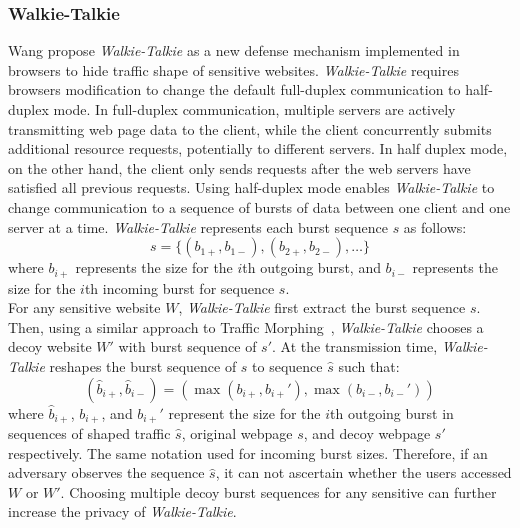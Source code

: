\subsubsection{Walkie-Talkie}\label{subsubsec:walkie-talkie}
Wang propose \textit{Walkie-Talkie} as a new defense mechanism implemented in browsers to hide traffic shape of sensitive websites.
\textit{Walkie-Talkie} requires browsers modification to change the default full-duplex communication to half-duplex mode.
In full-duplex communication, multiple servers are actively transmitting web page data to the client, while the client concurrently submits additional resource requests, potentially to different servers.
In half duplex mode, on the other hand, the client only sends requests after the web servers have satisfied all previous requests.
Using half-duplex mode enables \textit{Walkie-Talkie} to change communication to a sequence of bursts of data between one client and one server at a time. 
\textit{Walkie-Talkie} represents each burst sequence $s$ as follows:
\begin{equation*}
  s = \{(b_{1+}, b_{1-}), (b_{2+}, b_{2-}), \dots \}
\end{equation*}
where $b_{i+}$ represents the size for the $i$th outgoing burst, and $b_{i-}$ represents the size for the $i$th incoming burst for sequence $s$.
\\
For any sensitive website $W$, \textit{Walkie-Talkie} first extract the burst sequence $s$.  
Then, using a similar approach to Traffic Morphing~\cite{wright2009traffic}, \textit{Walkie-Talkie} chooses a decoy website $W'$ with burst sequence of $s'$.
At the transmission time, \textit{Walkie-Talkie} reshapes the burst sequence of $s$ to sequence $\hat{s}$ such that:
\begin{equation*}
  (\hat{b}_{i+}, \hat{b}_{i-}) = (\max(b_{i+}, b_{i+}'), \max(b_{i-}, b_{i-}'))
\end{equation*}
where $\hat{b}_{i+}$, $b_{i+}$, and $b_{i+}'$ represent the size for the $i$th outgoing burst in sequences of shaped traffic $\hat{s}$, original webpage $s$, and decoy webpage $s'$ respectively.
The same notation used for incoming burst sizes.
Therefore, if an adversary observes the sequence $\hat{s}$, it can not ascertain whether the users accessed $W$ or $W'$.
Choosing multiple decoy burst sequences for any sensitive can further increase the privacy of \textit{Walkie-Talkie}.

